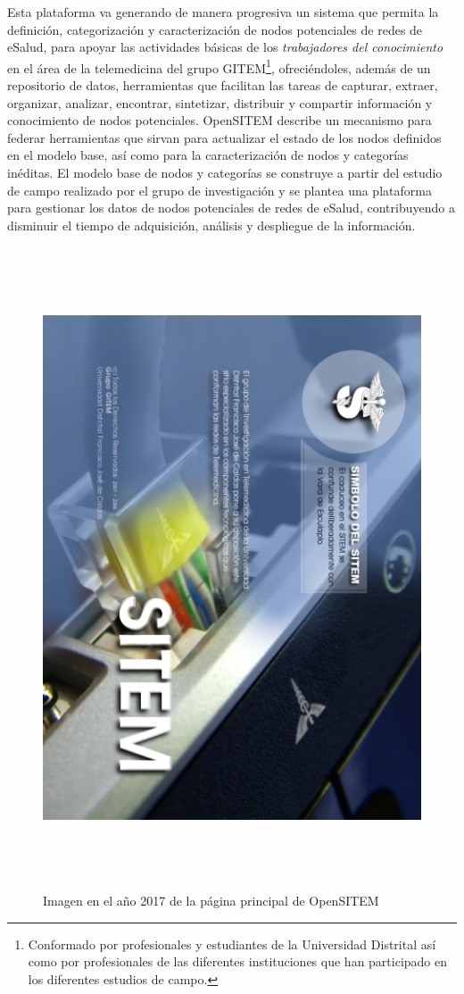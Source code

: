 Esta plataforma va generando de manera progresiva un sistema que permita la definición, categorización y caracterización de nodos potenciales de redes de eSalud, para apoyar las actividades básicas de los \textit{trabajadores del conocimiento} en el área de la telemedicina del grupo GITEM\footnote{Conformado por profesionales y estudiantes de la Universidad Distrital así como por profesionales de las diferentes instituciones que han participado en los diferentes estudios de campo.},  ofreciéndoles, además de un repositorio de datos, herramientas que facilitan las tareas de capturar, extraer, organizar, analizar, encontrar, sintetizar, distribuir y compartir información y conocimiento de nodos potenciales. OpenSITEM describe un mecanismo para federar herramientas que sirvan para actualizar el estado de los nodos definidos en el modelo base, así como para la caracterización de nodos y categorías inéditas. El modelo base de nodos y categorías se construye a partir del estudio de campo realizado por el grupo de investigación y se plantea una plataforma para gestionar los datos de nodos potenciales de redes de eSalud, contribuyendo a disminuir el tiempo de adquisición, análisis y despliegue de la información.  
\begin{figure}
 \centering
 \includegraphics[width=142mm, height=190mm]{sitem_principal.png}
 \caption{Imagen en el año 2017 de la página principal de OpenSITEM}
 \label{pantalla_sitem}
\end{figure}

